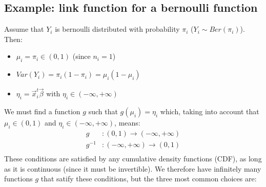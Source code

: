     \subsection{Example: link function for a bernoulli function}
      Assume that $Y_i$ is bernoulli distributed with probability $\pi_i$ ($Y_i \sim Ber(\pi_i)$). Then:
      \begin{itemize}
        \item $\mu_i = \pi_i \in (0,1)$ (since $n_i = 1$)
        \item $Var(Y_i) = \pi_i(1-\pi_i) = \mu_i(1-\mu_i)$
        \item $\eta_i = \vec{x}_i^t\vec{\beta}$ with $\eta_i \in (-\infty, +\infty)$
      \end{itemize}
      We must find a function $g$ such that $g(\mu_i)=\eta_i$ which, taking into account that $\mu_i \in (0, 1)$ and $\eta_i \in (-\infty, +\infty)$, means:
      \begin{align*}
        g&: (0, 1) \to (-\infty, +\infty) \\
        g^{-1}&: (-\infty, +\infty) \to (0, 1)  \\
      \end{align*}
      These conditions are satisfied by any cumulative density functions (CDF), as long as it is continuous (since it must be invertible).
      We therefore have infinitely many functions $g$ that satify these conditions, but the three most common choices are:
